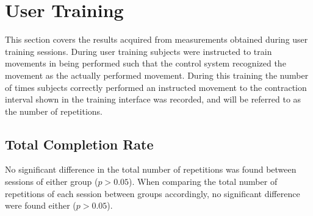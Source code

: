 
\section{User Training} \label{sec:R:userTraining}
This section covers the results acquired from measurements obtained during user training sessions. During user training subjects were instructed to train movements in being performed such that the control system recognized the movement as the actually performed movement. During this training the number of times subjects correctly performed an instructed movement to the contraction interval shown in the training interface was recorded, and will be referred to as the number of repetitions.

\subsection{Total Completion Rate}
No significant difference in the total number of repetitions was found between sessions of either group ($p > 0.05$). When comparing the total number of repetitions of each session between groups accordingly, no significant difference were found either ($p > 0.05$).
%

